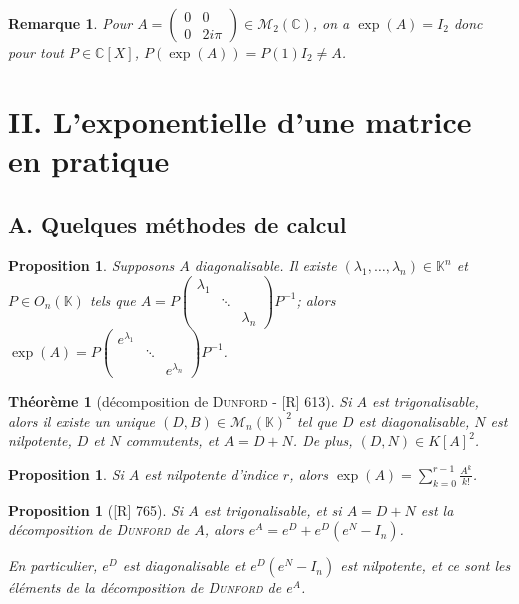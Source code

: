 \documentclass[10pt, a4paper, parskip=full, twoside, twocolumn]{report}
\newtheorem{theorem}[definition]{Théorème}
\newtheorem{proposition}[definition]{Proposition}
\newtheorem{remark}[definition]{Remarque}
\newcommand{\IK}{\mathbb{K}}
\newcommand{\IC}{\mathbb{C}}
\begin{document}
\begin{remark}
	Pour $A = \begin{pmatrix}
		0&0\\0& 2i\pi
	\end{pmatrix}\in\mathcal{M}_2(\IC)$, on a $\exp(A) = I_2$ donc pour tout $P\in \IC[X]$, $P(\exp(A)) = P(1)I_2 \neq A$.
\end{remark}

\section*{II. L'exponentielle d'une matrice en pratique}
\subsection*{A. Quelques méthodes de calcul}

\begin{proposition}
	Supposons $A$ diagonalisable. Il existe $(\lambda_1,\dots, \lambda_n)\in\IK^n$ et $P\in O_n(\IK)$ tels que 
	$A = P\begin{pmatrix}
		\lambda_1 & & \\
		& \ddots & \\
		& & \lambda_n
	\end{pmatrix}P^{-1}$; alors $\exp(A) = P\begin{pmatrix}
		e^{\lambda_1} & & \\ & \ddots & \\ & & e^{\lambda_n}
	\end{pmatrix}P^{-1}$.
\end{proposition}

\begin{theorem}[décomposition de \textsc{Dunford} - \textnormal{[R] 613}]
	Si $A$ est trigonalisable, alors il existe un unique $(D,B)\in \mathcal{M}_n(\IK)^2$ tel que $D$ est diagonalisable, $N$ est nilpotente, $D$ et $N$ commutents, et $A = D+N$.
	De plus, $(D,N)\in K[A]^2$.
\end{theorem}

\begin{proposition}
	Si $A$ est nilpotente d'indice $r$, alors $\exp(A) = \sum_{k=0}^{r-1} \frac{A^k}{k!}$.
\end{proposition}

\begin{proposition}[\textnormal{[R] 765}]
	Si $A$ est trigonalisable, et si $A=D+N$ est la décomposition de \textsc{Dunford} de $A$,
	alors $e^A = e^D + e^D(e^N-I_n)$.

	En particulier, $e^D$ est diagonalisable et $e^D(e^N -I_n)$ est nilpotente, et ce sont les éléments de la décomposition de \textsc{Dunford} de $e^A$.
\end{proposition}
\end{document}
